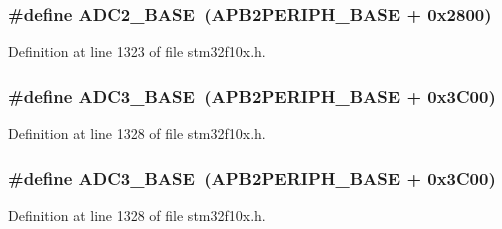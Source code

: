 \subsubsection[{\texorpdfstring{A\+D\+C2\+\_\+\+B\+A\+SE}{ADC2_BASE}}]{\setlength{\rightskip}{0pt plus 5cm}\#define A\+D\+C2\+\_\+\+B\+A\+SE~({\bf A\+P\+B2\+P\+E\+R\+I\+P\+H\+\_\+\+B\+A\+SE} + 0x2800)}\hypertarget{group___peripheral__memory__map_ga6544abc57f9759f610eee09a02442ae6}{}\label{group___peripheral__memory__map_ga6544abc57f9759f610eee09a02442ae6}


Definition at line 1323 of file stm32f10x.\+h.

\subsubsection[{\texorpdfstring{A\+D\+C3\+\_\+\+B\+A\+SE}{ADC3_BASE}}]{\setlength{\rightskip}{0pt plus 5cm}\#define A\+D\+C3\+\_\+\+B\+A\+SE~({\bf A\+P\+B2\+P\+E\+R\+I\+P\+H\+\_\+\+B\+A\+SE} + 0x3\+C00)}\hypertarget{group___peripheral__memory__map_gaca766f86c8e0b00a8e2b0224dcbb4c82}{}\label{group___peripheral__memory__map_gaca766f86c8e0b00a8e2b0224dcbb4c82}


Definition at line 1328 of file stm32f10x.\+h.

\subsubsection[{\texorpdfstring{A\+D\+C3\+\_\+\+B\+A\+SE}{ADC3_BASE}}]{\setlength{\rightskip}{0pt plus 5cm}\#define A\+D\+C3\+\_\+\+B\+A\+SE~({\bf A\+P\+B2\+P\+E\+R\+I\+P\+H\+\_\+\+B\+A\+SE} + 0x3\+C00)}\hypertarget{group___peripheral__memory__map_gaca766f86c8e0b00a8e2b0224dcbb4c82}{}\label{group___peripheral__memory__map_gaca766f86c8e0b00a8e2b0224dcbb4c82}


Definition at line 1328 of file stm32f10x.\+h.

